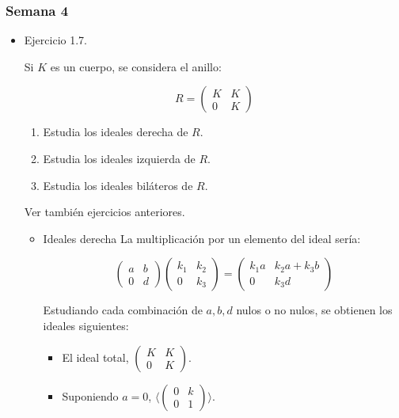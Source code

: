 \documentclass[11pt]{article}
\begin{document}
\subsubsection*{Semana 4}
\label{sec-7-4-4}
\begin{itemize}
\item Ejercicio 1.7.
\label{sec-7-4-4-1}
\begin{statement}
Si $K$ es un cuerpo, se considera el anillo:

\[
R = \begin{pmatrix}
K & K \\ 0 & K
\end{pmatrix}
\]

\begin{enumerate}
\item Estudia los ideales derecha de $R$.
\item Estudia los ideales izquierda de $R$.
\item Estudia los ideales biláteros de $R$.
\end{enumerate}

Ver también ejercicios anteriores.
\end{statement}

\begin{itemize}
\item Ideales derecha
\label{sec-7-4-4-1-1}
La multiplicación por un elemento del ideal sería:

\[\begin{pmatrix}
a & b \\ 0 & d
\end{pmatrix}\begin{pmatrix}
k_1 & k_2 \\ 0 & k_3
\end{pmatrix}  = \begin{pmatrix}
k_1a & k_2a+k_3b \\ 0 & k_3d
\end{pmatrix}\]

Estudiando cada combinación de $a,b,d$ nulos o no nulos, se obtienen
los ideales siguientes:

\begin{itemize}
\item El ideal total, $\begin{pmatrix}K & K \\ 0 & K\end{pmatrix}$.

\item Suponiendo $a=0$, $\langle\begin{pmatrix}0 & k \\ 0 & 1\end{pmatrix}\rangle$.


\end{itemize}
\end{itemize}
\end{itemize}
\end{document}
